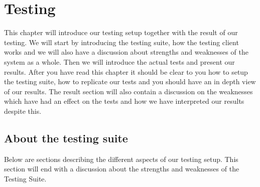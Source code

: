 \section{Testing}\label{Testing}
	This chapter will introduce our testing setup together with the result of our testing. We will start by introducing the testing suite, how the testing client works and we will also have a discussion about strengths and weaknesses of the system as a whole. Then we will introduce the actual tests and present our results. After you have read this chapter it should be clear to you how to setup the testing suite, how to replicate our tests and you should have an in depth view of our results. The result section will also contain a discussion on the weaknesses which have had an effect on the tests and how we have interpreted our results despite this.
	    
    \subsection{About the testing suite}\label{Testing:About}
    	Below are sections describing the different aspects of our testing setup. This section will end with a discussion about the strengths and weaknesses of the Testing Suite.
    	
 		
    	
    	

	

    

